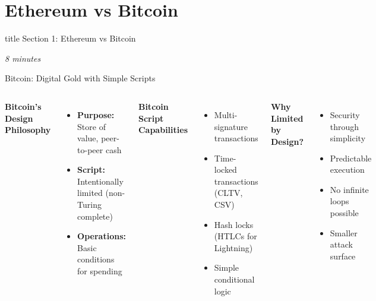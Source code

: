 \documentclass[8pt,aspectratio=169]{beamer}
\begin{document}
\section{Ethereum vs Bitcoin}

\begin{frame}[t]
\vfill
\centering
\begin{beamercolorbox}[sep=8pt,center]{title}
\Large Section 1: Ethereum vs Bitcoin\par
\end{beamercolorbox}
\vfill
\small \textit{8 minutes}
\end{frame}

\begin{frame}[t]{Bitcoin: Digital Gold with Simple Scripts}
\begin{columns}[T]
\textbf{Bitcoin's Design Philosophy}

\begin{itemize}
\item \textbf{Purpose:} Store of value, peer-to-peer cash
\item \textbf{Script:} Intentionally limited (non-Turing complete)
\item \textbf{Operations:} Basic conditions for spending
\end{itemize}

\vspace{0.5em}
\textbf{Bitcoin Script Capabilities}
\begin{itemize}
\item Multi-signature transactions
\item Time-locked transactions (CLTV, CSV)
\item Hash locks (HTLCs for Lightning)
\item Simple conditional logic
\end{itemize}

\textbf{Why Limited by Design?}

\begin{itemize}
\item[\textcolor{mlgreen}{+}] Security through simplicity
\item[\textcolor{mlgreen}{+}] Predictable execution
\item[\textcolor{mlgreen}{+}] No infinite loops possible
\item[\textcolor{mlgreen}{+}] Smaller attack surface
\end{itemize}


\end{columns}
\end{frame}
\end{document}
